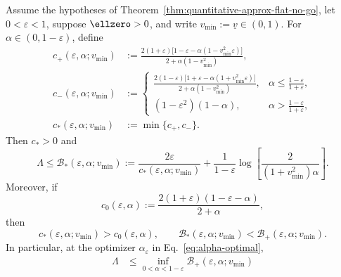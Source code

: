 \begin{theorem}
\label{thm:refined-positive-l-span}
Assume the hypotheses of
Theorem~\ref{thm:quantitative-approx-flat-no-go}, let
$0<\varepsilon<1$, suppose $\ellzero>0$, and write
$v_{\mathrm{min}}:=\underline v\in(0,1)$. For
$\alpha\in(0,1-\varepsilon)$, define
\begin{align}
c_+(\varepsilon,\alpha;v_{\mathrm{min}})
&:=\frac{2(1+\varepsilon)
\bigl[1-\varepsilon-\alpha(1-v_{\mathrm{min}}^2\varepsilon)\bigr]}
{2+\alpha(1-v_{\mathrm{min}}^2)},
\label{eq:c-plus-refined}\\
c_-(\varepsilon,\alpha;v_{\mathrm{min}})
&:=
\begin{cases}
\displaystyle
\frac{2(1-\varepsilon)
\bigl[1+\varepsilon-\alpha(1+v_{\mathrm{min}}^2\varepsilon)\bigr]}
{2+\alpha(1-v_{\mathrm{min}}^2)},
&\displaystyle
\alpha\leqslant\frac{1-\varepsilon}{1+\varepsilon},\\[3mm]
(1-\varepsilon^2)(1-\alpha),
&\displaystyle
\alpha>\frac{1-\varepsilon}{1+\varepsilon},
\end{cases}
\label{eq:c-minus-refined}\\
c_*(\varepsilon,\alpha;v_{\mathrm{min}})&:=\min\{c_+,c_-\}.
\label{eq:c-star-refined}
\end{align}
Then $c_*>0$ and
\begin{equation}
\Lambda\leqslant
\mathcal B_*(\varepsilon,\alpha;v_{\mathrm{min}}):=
\frac{2\varepsilon}{c_*(\varepsilon,\alpha;v_{\mathrm{min}})}
+\frac{1}{1-\varepsilon}
\log\!\left[\frac{2}{(1+v_{\mathrm{min}}^2)\alpha}\right].
\label{eq:refined-positive-l-bound}
\end{equation}
Moreover, if
\begin{equation}
c_0(\varepsilon,\alpha):=
\frac{2(1+\varepsilon)(1-\varepsilon-\alpha)}{2+\alpha},
\label{eq:c-zero-old-comparison}
\end{equation}
then
\begin{equation}
c_*(\varepsilon,\alpha;v_{\mathrm{min}})>c_0(\varepsilon,\alpha),
\qquad
\mathcal B_*(\varepsilon,\alpha;v_{\mathrm{min}})
<\mathcal B_+(\varepsilon,\alpha;v_{\mathrm{min}}).
\label{eq:strict-positive-l-gap}
\end{equation}
In particular, at the optimizer $\alpha_\varepsilon$ in
Eq.~\eqref{eq:alpha-optimal},
\begin{equation}
\begin{aligned}
\Lambda
&\leqslant\inf_{0<\alpha<1-\varepsilon}
\mathcal B_+(\varepsilon,\alpha;v_{\mathrm{min}})
\\

\end{aligned}
\end{equation}
\end{theorem}
